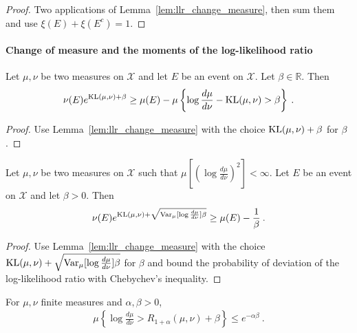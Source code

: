 \begin{proof}\leanok
{}
Two applications of Lemma~\ref{lem:llr_change_measure}, then sum them and use $\xi(E)+\xi(E^c) = 1$.
\end{proof}



\paragraph{Change of measure and the moments of the log-likelihood ratio}

\begin{corollary}
  \label{cor:kl_change_measure}
  Let $\mu, \nu$ be two measures on $\mathcal X$ and let $E$ be an event on $\mathcal X$. Let $\beta \in \mathbb{R}$. Then
  \begin{align*}
  \nu(E) e^{\operatorname{KL}(\mu, \nu) + \beta} \ge \mu(E) - \mu\left\{ \log\frac{d \mu}{d \nu} - \operatorname{KL}(\mu, \nu) > \beta \right\} \: .
  \end{align*}
\end{corollary}

\begin{proof}
Use Lemma~\ref{lem:llr_change_measure} with the choice $\operatorname{KL}(\mu, \nu) + \beta$ for $\beta$.
\end{proof}

\begin{lemma}
  \label{lem:llr_change_measure_variance}
  \uses{}
  Let $\mu, \nu$ be two measures on $\mathcal X$ such that $\mu\left[\left(\log\frac{d \mu}{d \nu}\right)^2\right] < \infty$. Let $E$ be an event on $\mathcal X$ and let $\beta > 0$. Then
  \begin{align*}
  \nu(E) e^{\operatorname{KL}(\mu, \nu) + \sqrt{\operatorname{Var}_\mu[\log\frac{d \mu}{d \nu}]\beta}} \ge \mu(E) - \frac{1}{\beta} \: .
  \end{align*}
\end{lemma}

\begin{proof}%
{}
Use Lemma~\ref{lem:llr_change_measure} with the choice $\operatorname{KL}(\mu, \nu) + \sqrt{\operatorname{Var}_\mu[\log\frac{d \mu}{d \nu}]\beta}$ for $\beta$ and bound the probability of deviation of the log-likelihood ratio with Chebychev's inequality.
\end{proof}

\begin{lemma}
  \label{lem:renyi_chernoff_bound}
  \leanok
  For $\mu, \nu$ finite measures and $\alpha, \beta > 0$,
  \begin{align*}
  \mu\left\{ \log\frac{d \mu}{d \nu} > R_{1+\alpha}(\mu, \nu) + \beta \right\}
  \le e^{- \alpha \beta}
  \: .
  \end{align*}
\end{lemma}

